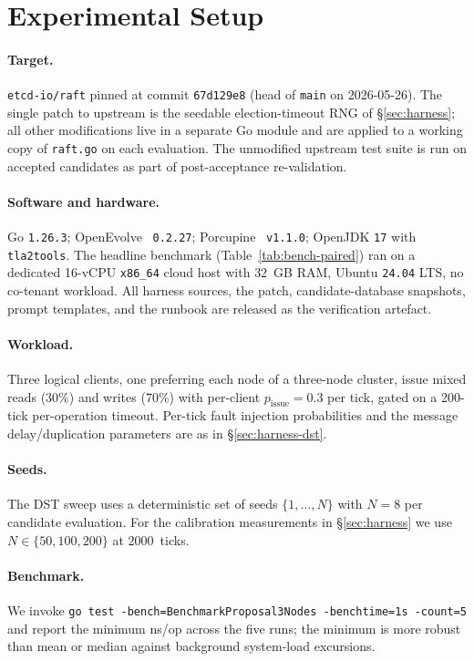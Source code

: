 \documentclass{article}
\begin{document}
\section{Experimental Setup}
\label{sec:setup}

\paragraph{Target.}
\texttt{etcd-io/raft} pinned at commit \texttt{67d129e8} (head of
\texttt{main} on 2026-05-26). The single patch to upstream is the
seedable election-timeout RNG of \S\ref{sec:harness}; all other
modifications live in a separate Go module and are applied to a
working copy of \texttt{raft.go} on each evaluation. The unmodified
upstream test suite is run on accepted candidates as part of
post-acceptance re-validation.

\paragraph{Software and hardware.}
Go \texttt{1.26.3}; OpenEvolve~\cite{openevolve} \texttt{0.2.27};
Porcupine~\cite{porcupine} \texttt{v1.1.0}; OpenJDK \texttt{17} with
\texttt{tla2tools}. The headline benchmark
(Table~\ref{tab:bench-paired}) ran on a dedicated 16-vCPU
\texttt{x86\_64} cloud host with $32$~GB RAM, Ubuntu \texttt{24.04}
LTS, no co-tenant workload. All harness sources, the patch,
candidate-database snapshots, prompt templates, and the runbook are
released as the verification artefact.

\paragraph{Workload.}
Three logical clients, one preferring each node of a three-node
cluster, issue mixed reads (30\%) and writes (70\%) with per-client
$p_\text{issue}=0.3$ per tick, gated on a 200-tick per-operation
timeout. Per-tick fault injection probabilities and the message
delay/duplication parameters are as in \S\ref{sec:harness-dst}.

\paragraph{Seeds.}
The DST sweep uses a deterministic set of seeds
$\{1,\ldots,N\}$ with $N=8$ per candidate evaluation. For the
calibration measurements in \S\ref{sec:harness} we use $N\in\{50, 100,
200\}$ at $2000$~ticks.

\paragraph{Benchmark.}
We invoke \texttt{go test -bench=BenchmarkProposal3Nodes -benchtime=1s
-count=5} and report the minimum ns/op across the five runs; the
minimum is more robust than mean or median against background
system-load excursions.
\end{document}
